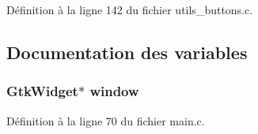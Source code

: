 Définition à la ligne 142 du fichier utils\_\-buttons.c.



\subsection{Documentation des variables}
\subsubsection[{window}]{\setlength{\rightskip}{0pt plus 5cm}GtkWidget$\ast$ {\bf window}}\label{utils__buttons_8c_a3d346c08cf2d67c388caabffb412b293}


Définition à la ligne 70 du fichier main.c.

